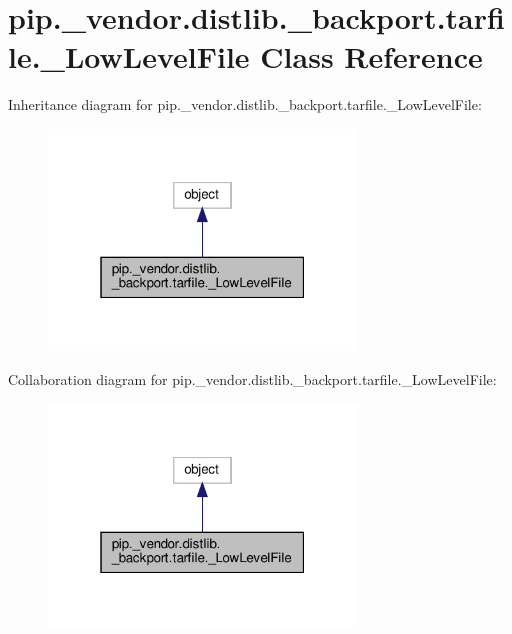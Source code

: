 \hypertarget{classpip_1_1__vendor_1_1distlib_1_1__backport_1_1tarfile_1_1__LowLevelFile}{}\section{pip.\+\_\+vendor.\+distlib.\+\_\+backport.\+tarfile.\+\_\+\+Low\+Level\+File Class Reference}
\label{classpip_1_1__vendor_1_1distlib_1_1__backport_1_1tarfile_1_1__LowLevelFile}


Inheritance diagram for pip.\+\_\+vendor.\+distlib.\+\_\+backport.\+tarfile.\+\_\+\+Low\+Level\+File\+:
\nopagebreak
\begin{figure}[H]
\begin{center}
\leavevmode
\includegraphics[width=232pt]{classpip_1_1__vendor_1_1distlib_1_1__backport_1_1tarfile_1_1__LowLevelFile__inherit__graph}
\end{center}
\end{figure}


Collaboration diagram for pip.\+\_\+vendor.\+distlib.\+\_\+backport.\+tarfile.\+\_\+\+Low\+Level\+File\+:
\nopagebreak
\begin{figure}[H]
\begin{center}
\leavevmode
\includegraphics[width=232pt]{classpip_1_1__vendor_1_1distlib_1_1__backport_1_1tarfile_1_1__LowLevelFile__coll__graph}
\end{center}
\end{figure}
